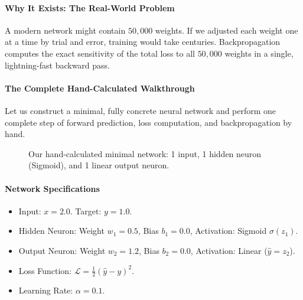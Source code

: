 \paragraph{Why It Exists: The Real-World Problem}
A modern network might contain $50{,}000$ weights. If we adjusted each weight one at a time by trial and error, training would take centuries. Backpropagation computes the exact sensitivity of the total loss to all $50{,}000$ weights in a single, lightning-fast backward pass.

\paragraph{The Complete Hand-Calculated Walkthrough}
Let us construct a minimal, fully concrete neural network and perform one complete step of forward prediction, loss computation, and backpropagation by hand.

\begin{figure}[htbp]
\centering
{}
\caption{Our hand-calculated minimal network: 1 input, 1 hidden neuron (Sigmoid), and 1 linear output neuron.}\label{fig:hand_network}
\end{figure}

\paragraph{Network Specifications}
\begin{itemize}
    \item Input: $x = 2.0$. Target: $y = 1.0$.
    \item Hidden Neuron: Weight $w_1 = 0.5$, Bias $b_1 = 0.0$, Activation: Sigmoid $\sigma(z_1)$.
    \item Output Neuron: Weight $w_2 = 1.2$, Bias $b_2 = 0.0$, Activation: Linear ($\hat{y} = z_2$).
    \item Loss Function: $\mathcal{L} = \frac{1}{2}(\hat{y} - y)^2$.
    \item Learning Rate: $\alpha = 0.1$.
\end{itemize}

